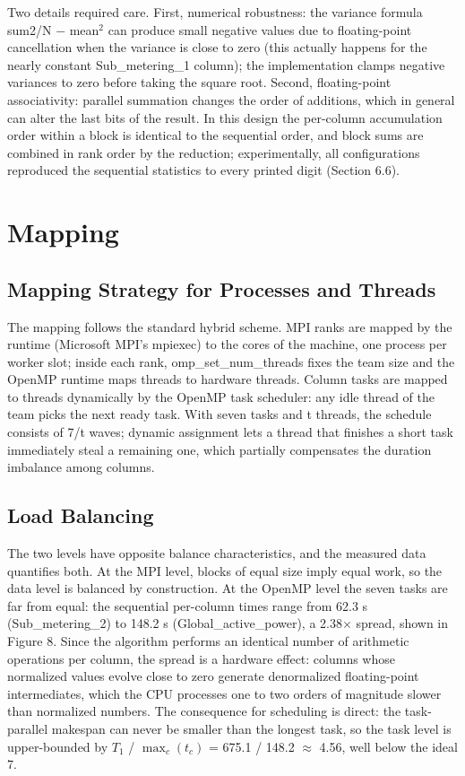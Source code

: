 \documentclass[12pt,a4paper]{article}
\begin{document}
Two details required care. First, numerical robustness: the variance
formula sum2/N $-$ mean$^2$ can produce small negative values due to
floating-point cancellation when the variance is close to zero (this
actually happens for the nearly constant Sub\_metering\_1 column); the
implementation clamps negative variances to zero before taking the
square root. Second, floating-point associativity: parallel summation
changes the order of additions, which in general can alter the last bits
of the result. In this design the per-column accumulation order within a
block is identical to the sequential order, and block sums are combined
in rank order by the reduction; experimentally, all configurations
reproduced the sequential statistics to every printed digit (Section
6.6).

\section{Mapping}

\subsection{Mapping Strategy for Processes and Threads}

The mapping follows the standard hybrid scheme. MPI ranks are mapped by
the runtime (Microsoft MPI's mpiexec) to the cores of
the machine, one process per worker slot; inside each rank,
omp\_set\_num\_threads fixes the team size and the OpenMP runtime maps
threads to hardware threads. Column tasks are mapped to threads
dynamically by the OpenMP task scheduler: any idle thread of the team
picks the next ready task. With seven tasks and t threads, the schedule
consists of 7/t waves; dynamic assignment lets a thread that finishes a
short task immediately steal a remaining one, which partially
compensates the duration imbalance among columns.

\subsection{Load Balancing}

The two levels have opposite balance characteristics, and the measured
data quantifies both. At the MPI level, blocks of equal size imply equal
work, so the data level is balanced by construction. At the OpenMP level
the seven tasks are far from equal: the sequential per-column times
range from 62.3 s (Sub\_metering\_2) to 148.2 s (Global\_active\_power),
a 2.38$\times$ spread, shown in Figure 8. Since the algorithm performs an
identical number of arithmetic operations per column, the spread is a
hardware effect: columns whose normalized values evolve close to zero
generate denormalized floating-point intermediates, which the CPU
processes one to two orders of magnitude slower than normalized numbers.
The consequence for scheduling is direct: the task-parallel makespan can
never be smaller than the longest task, so the task level is
upper-bounded by $T_1$ / $\max_c(t_c)$ = 675.1 / 148.2 $\approx$ 4.56, well below the
ideal 7.
\end{document}
